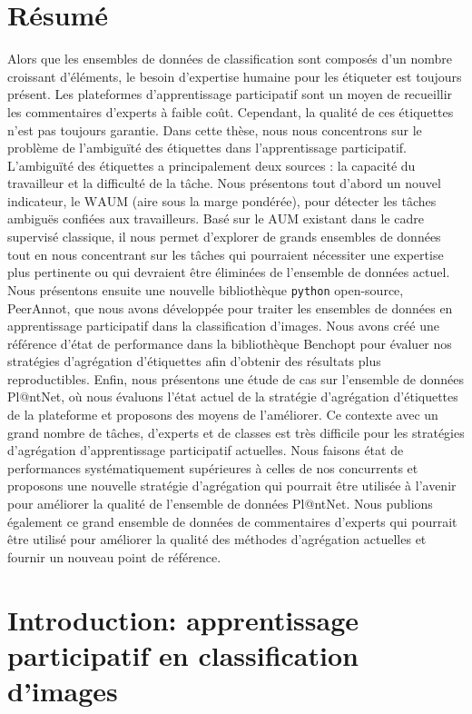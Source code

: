 \section{Résumé}
Alors que les ensembles de données de classification sont composés d'un nombre croissant d'éléments, le besoin d'expertise humaine pour les étiqueter est toujours présent. Les plateformes d'apprentissage participatif sont un moyen de recueillir les commentaires d'experts à faible coût. Cependant, la qualité de ces étiquettes n'est pas toujours garantie. Dans cette thèse, nous nous concentrons sur le problème de l'ambiguïté des étiquettes dans l'apprentissage participatif. L'ambiguïté des étiquettes a principalement deux sources : la capacité du travailleur et la difficulté de la tâche. Nous présentons tout d'abord un nouvel indicateur, le $\mathrm{WAUM}$ (aire sous la marge pondérée), pour détecter les tâches ambiguës confiées aux travailleurs. Basé sur le $\mathrm{AUM}$ existant dans le cadre supervisé classique, il nous permet d'explorer de grands ensembles de données tout en nous concentrant sur les tâches qui pourraient nécessiter une expertise plus pertinente ou qui devraient être éliminées de l'ensemble de données actuel. Nous présentons ensuite une nouvelle bibliothèque \texttt{python} open-source, PeerAnnot, que nous avons développée pour traiter les ensembles de données en apprentissage participatif dans la classification d'images. Nous avons créé une référence d'état de performance dans la bibliothèque Benchopt pour évaluer nos stratégies d'agrégation d'étiquettes afin d'obtenir des résultats plus reproductibles. Enfin, nous présentons une étude de cas sur l'ensemble de données Pl@ntNet, où nous évaluons l'état actuel de la stratégie d'agrégation d'étiquettes de la plateforme et proposons des moyens de l'améliorer. Ce contexte avec un grand nombre de tâches, d'experts et de classes est très difficile pour les stratégies d'agrégation d'apprentissage participatif actuelles. Nous faisons état de performances systématiquement supérieures à celles de nos concurrents et proposons une nouvelle stratégie d'agrégation qui pourrait être utilisée à l'avenir pour améliorer la qualité de l'ensemble de données Pl@ntNet. Nous publions également ce grand ensemble de données de commentaires d'experts qui pourrait être utilisé pour améliorer la qualité des méthodes d'agrégation actuelles et fournir un nouveau point de référence.

\section{Introduction: apprentissage participatif en classification d'images}

